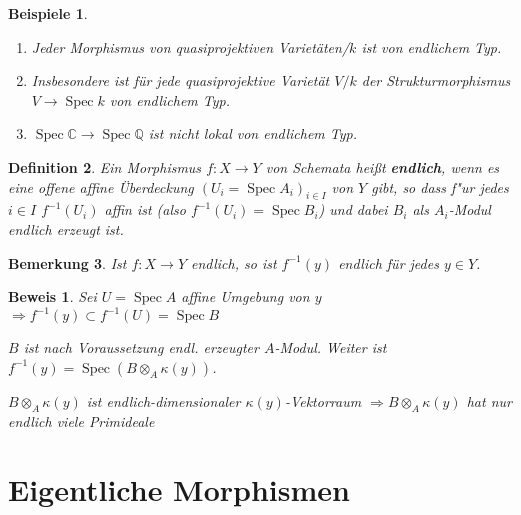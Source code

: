 \documentclass[paper = A4, fontsize=12pt, numbers=noendperiod, chapterprefix=true]{scrbook}
\theoremstyle{break}
\newtheorem{Def}{Definition}[section]
\newtheorem{Bem}[Def]{Bemerkung}
\newtheorem{Bspe}[Def]{Beispiele}
\theoremstyle{nonumberbreak}
\newtheorem{bew}{Beweis}
\theoremstyle{nonumberplain}
\newcommand{\quot}[1]{\textrm{\glqq}{#1}\textrm{\grqq}}
\newcommand{\emp}[1]{\textbf{\emph{#1}}}
\newcommand{\defterm}[1]{{\index{#1}}\emp{#1}}
\DeclareMathOperator{\Spec}{Spec}
\newcommand{\C}{\mathbb{C}}
\newcommand{\Q}{\mathbb{Q}}
\begin{document}
\begin{Bspe}\begin{enumerate}[1)]
\item
	Jeder Morphismus von quasiprojektiven Variet\"aten/$k$ ist von endlichem Typ.
\item
	Insbesondere ist f\"ur jede quasiprojektive Variet\"at $V/k$ der \quot{Strukturmorphismus} $V \to \Spec k$ von endlichem Typ.
\item
	$\Spec \C \to \Spec \Q$ ist nicht lokal von endlichem Typ.
\end{enumerate}\end{Bspe}

\begin{Def}
Ein Morphismus $f: X \to Y$ von Schemata hei\ss t \defterm{endlich}, wenn es eine offene affine \"Uberdeckung $(U_i = \Spec A_i)_{i\in I}$ von $Y$ gibt, so dass f"ur jedes $i \in I$ $f^{-1}(U_i)$ affin ist (also $f^{-1}(U_i) = \Spec B_i$) und dabei $B_i$ als $A_i$-Modul endlich erzeugt ist.
\end{Def}

\begin{Bem}
Ist $f: X \to Y$ endlich, so ist $f^{-1}(y)$ endlich f\"ur jedes $y \in Y$.
\end{Bem}

\begin{bew}
Sei $U = \Spec A$ affine Umgebung von $y$ $\Rightarrow f^{-1}(y) \subset f^{-1}(U) = \Spec B$

$B$ ist nach Voraussetzung endl. erzeugter $A$-Modul. Weiter ist $f^{-1}(y) = \Spec (B \otimes_A \kappa(y))$.

$B \otimes_A \kappa(y)$ ist endlich-dimensionaler $\kappa(y)$-Vektorraum $\Rightarrow B \otimes_A \kappa(y)$ hat nur endlich viele Primideale
\end{bew}

\newpage


\section{Eigentliche Morphismen}
\end{document}
